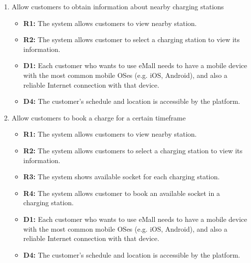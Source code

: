 \begin{enumerate}[label=\textbf{-G\arabic*}:]
    \item {Allow customers to obtain information about nearby charging stations
          \begin{itemize}
              \item \textbf{R1:} The system allows customers to view nearby station.
              \item \textbf{R2:} The system allows customer to select a charging station to view its information.
              \item \textbf{D1:} Each customer who wants to use eMall needs to have a mobile device with the most common mobile OSes (e.g. iOS, Android), and also a reliable Internet connection with that device.
              \item \textbf{D4:} The customer's schedule and location is accessible by the platform.
          \end{itemize}
          }
    \item {Allow customers to book a charge for a certain timeframe
          \begin{itemize}
              \item \textbf{R1:} The system allows customers to view nearby station.  
              \item\textbf{R2:} The system allows customers to select a charging station to view its information.
              \item \textbf{R3:} The system shows available socket for each charging station.
              \item \textbf{R4:} The system allows customer to book an available socket in a charging station.
              \item \textbf{D1:} Each customer who wants to use eMall needs to have a mobile device with the most common mobile OSes (e.g. iOS, Android), and also a reliable Internet connection with that device.
              \item \textbf{D4:} The customer's schedule and location is accessible by the platform.
                            

\end{itemize}}
\end{enumerate}
